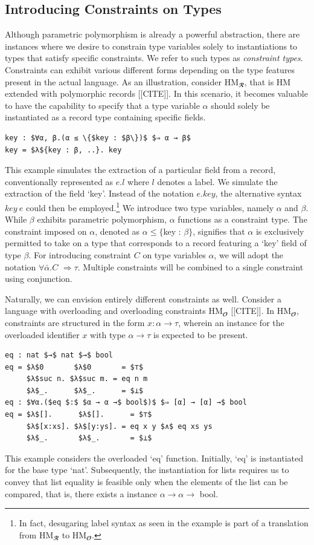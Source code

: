 \documentclass[runningheads]{llncs}
\begin{document}
\subsection{Introducing Constraints on Types}
Although parametric polymorphism is already a powerful abstraction, there are
instances where we desire to constrain type variables solely to instantiations
to types that satisfy specific constraints.
We refer to such types as \emph{constraint types}.
Constraints can exhibit various different forms depending on the type features
present in the actual language.
As an illustration, consider HM$_𝓡$, that is HM extended with
polymorphic records [[CITE]].
In this scenario, it becomes valuable to have the capability to specify that a
type variable $α$
should solely be instantiated as a record type containing specific fields.
\begin{example}
  \begin{lstlisting}
key : $∀α, β.(α ≤ \{$key : $β\})$ $⇒ α → β$
key = $λ${key : β, ..}. key
  \end{lstlisting}
\end{example}
This example simulates the extraction of a particular field from a record,
conventionally
represented as $e.l$ where $l$ denotes a label.
We simulate the extraction of  the field `key'.
Instead of the notation $e.key$, the alternative syntax $key \ e$ could then be
employed.\footnote{
  In fact, desugaring label syntax as seen in the example
  is part of a translation from HM$_𝓡$ to HM$_𝓞$.
}
We introduce two type variables, namely $α$ and $β$. While $β$ exhibits
parametric polymorphism, $α$ functions as a constraint type.
The constraint imposed on $α$, denoted as $α ≤ \{$key : $β\}$, signifies that
$α$ is exclusively permitted to take on a type that corresponds to a record
featuring a `key' field of type $β$.
For introducing constraint $C$ on type variables $α$, we will adopt the
notation $∀\bar{α}.C$ $⇒ τ$.
Multiple constraints will be combined to a single
constraint using conjunction.

Naturally, we can envision entirely different constraints as well.
Consider a language with overloading and overloading constraints
HM$_𝓞$ [[CITE]].
In HM$_𝓞$, constraints are structured in the form $x : α → τ$,
wherein an instance for the overloaded identifier $x$ with type $α → τ$ is
expected to be present.
\begin{example}
  \begin{lstlisting}
eq : nat $→$ nat $→$ bool
eq = $λ$0       $λ$0       = $⊤$
     $λ$suc n. $λ$suc m. = eq n m 
     $λ$_.      $λ$_.      = $⊥$
eq : $∀α.($eq $:$ $α → α →$ bool$)$ $⇒ [α] → [α] →$ bool
eq = $λ$[].      $λ$[].      = $⊤$
     $λ$[x:xs]. $λ$[y:ys]. = eq x y $∧$ eq xs ys
     $λ$_.       $λ$_.       = $⊥$
  \end{lstlisting}
\end{example}
This example considers the overloaded `eq' function.
Initially, `eq' is instantiated for the base type `nat'.
Subsequently, the instantiation for lists requires us to convey that list
equality is feasible only when
the elements of the list can be compared, that is, there exists a instance $α →
  α →$ bool.
\end{document}
